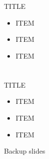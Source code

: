 \documentclass[14pt,dvipdfmx]{beamer}
\title{%
\texorpdfstring{%
\large
TITLE
\vskip10pt%
{\color{gray}\hrule height 1pt}%
\vskip-20pt%
}
{title}
}
\author{%
\texorpdfstring{%
\small
NAME
\\[-\baselineskip]  
{%
\setlength{\leftmargini}{12pt}
\setlength{\leftmarginii}{16pt}
\begin{itemize}
 \footnotesize
 \color{black}
 \setlength\itemsep{0pt}
 \setlength\parskip{0pt}
 \item Motivation
 \begin{itemize}
  \footnotesize
  \color{black}
  \item ...
 \end{itemize}
 \item Model and method
 \begin{itemize}
  \footnotesize
  \color{black}
  \item ...
  \item ...
 \end{itemize}
 \item Results
 \begin{itemize}
  \footnotesize
  \color{black}
  \item ...
 \end{itemize}
 \item Conclusions
 \begin{itemize}
  \footnotesize
  \color{black}
  \item ...
 \end{itemize}
\end{itemize}
}
}
{NAME}
}
\date{}
\begin{document}

\begin{frame}
\maketitle
\end{frame}


\section[]{}
\begin{frame}[containsverbatim,c]{%
TITLE}
\begin{center}
\footnotesize
{\setlength{\leftmargini}{12pt}
\setlength{\leftmarginii}{16pt}
\begin{itemize}
 \item
ITEM
 \item
ITEM
 \item
ITEM
\end{itemize}}
\end{center}
\end{frame}

\section[]{}
\begin{frame}[containsverbatim,c]{%
TITLE}
\begin{center}
\footnotesize
{\setlength{\leftmargini}{12pt}
\setlength{\leftmarginii}{16pt}
\begin{itemize}
 \item
ITEM
 \item
ITEM
 \item
ITEM
\end{itemize}}
\end{center}
\end{frame}

\appendix
\bgroup   
{}
\begin{frame}[plain]{}
\end{frame}
\egroup
\bgroup
{}
\begin{frame}[plain]{}
\centering
Backup slides
\end{frame}
\egroup
\end{document}
